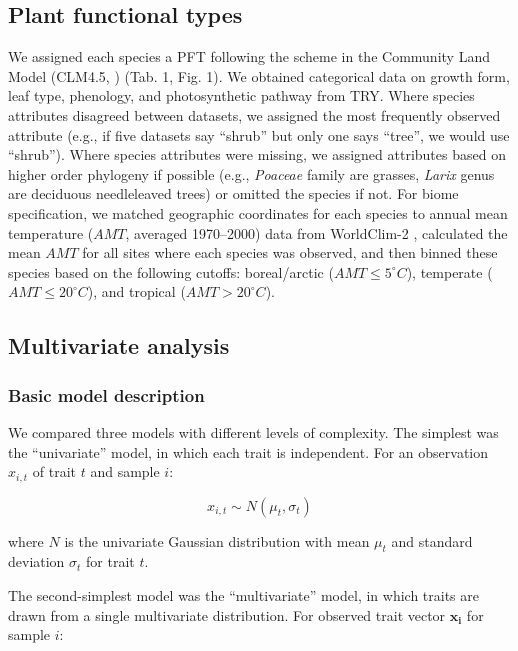 \documentclass{article}
\begin{document}
\subsection{Plant functional types}

We assigned each species a PFT following the scheme in the Community Land Model (CLM4.5, \citealt{clm45_note}) (Tab. 1, Fig. 1).
We obtained categorical data on growth form, leaf type, phenology, and photosynthetic pathway from TRY.
Where species attributes disagreed between datasets, we assigned the most frequently observed attribute (e.g., if five datasets say ``shrub'' but only one says ``tree'', we would use ``shrub'').
Where species attributes were missing, we assigned attributes based on higher order phylogeny if possible (e.g., \textit{Poaceae} family are grasses, \textit{Larix} genus are deciduous needleleaved trees) or omitted the species if not.
For biome specification, we matched geographic coordinates for each species to annual mean temperature ($AMT$, averaged 1970--2000) data from WorldClim-2 \citep{fick_2017_worldclim},
calculated the mean $AMT$ for all sites where each species was observed,
and then binned these species based on the following cutoffs: boreal/arctic ($AMT \leq 5^\circ C$), temperate ($AMT \leq 20^\circ C$), and tropical ($AMT > 20^\circ C$).

\subsection{Multivariate analysis}

\subsubsection{Basic model description}

We compared three models with different levels of complexity.
The simplest was the ``univariate'' model, in which each trait is independent.
For an observation $x_{i,t}$ of trait $t$ and sample $i$:

\begin{equation}
x_{i,t} \sim N(\mu_t, \sigma_t)
\end{equation}

where $N$ is the univariate Gaussian distribution with mean $\mu_t$ and standard deviation $\sigma_t$ for trait $t$.

The second-simplest model was the ``multivariate'' model, in which traits are drawn from a single multivariate distribution.
For observed trait vector ${\bm{x_i}}$ for sample $i$:
\end{document}
